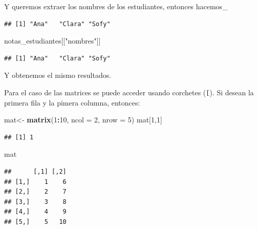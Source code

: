 \documentclass[
]{book}
\newenvironment{Shaded}{\begin{snugshade}}{\end{snugshade}}
\newcommand{\AttributeTok}[1]{\textcolor[rgb]{0.13,0.29,0.53}{#1}}
\newcommand{\DecValTok}[1]{\textcolor[rgb]{0.00,0.00,0.81}{#1}}
\newcommand{\FunctionTok}[1]{\textcolor[rgb]{0.13,0.29,0.53}{\textbf{#1}}}
\newcommand{\NormalTok}[1]{#1}
\newcommand{\OtherTok}[1]{\textcolor[rgb]{0.56,0.35,0.01}{#1}}
\newcommand{\SpecialCharTok}[1]{\textcolor[rgb]{0.81,0.36,0.00}{\textbf{#1}}}
\newcommand{\StringTok}[1]{\textcolor[rgb]{0.31,0.60,0.02}{#1}}
\begin{document}
Y queremos extraer los nombres de los estudiantes, entonces hacemos\_

\begin{Shaded}
\end{Shaded}

\begin{verbatim}
## [1] "Ana"   "Clara" "Sofy"
\end{verbatim}

\begin{Shaded}
\begin{Highlighting}[]
\NormalTok{notas\_estudiantes[[}\StringTok{"nombres"}\NormalTok{]]}
\end{Highlighting}
\end{Shaded}

\begin{verbatim}
## [1] "Ana"   "Clara" "Sofy"
\end{verbatim}

Y obtenemos el mismo resultados.

Para el caso de las matrices se puede acceder usando corchetes (\texttt{{[}}).
Si desean la primera fila y la pimera columna, entonces:

\begin{Shaded}
\begin{Highlighting}[]
\NormalTok{mat}\OtherTok{\textless{}{-}} \FunctionTok{matrix}\NormalTok{(}\DecValTok{1}\SpecialCharTok{:}\DecValTok{10}\NormalTok{, }\AttributeTok{ncol =} \DecValTok{2}\NormalTok{, }\AttributeTok{nrow =} \DecValTok{5}\NormalTok{)}
\NormalTok{mat[}\DecValTok{1}\NormalTok{,}\DecValTok{1}\NormalTok{]}
\end{Highlighting}
\end{Shaded}

\begin{verbatim}
## [1] 1
\end{verbatim}

\begin{Shaded}
\begin{Highlighting}[]
\NormalTok{mat}
\end{Highlighting}
\end{Shaded}

\begin{verbatim}
##      [,1] [,2]
## [1,]    1    6
## [2,]    2    7
## [3,]    3    8
## [4,]    4    9
## [5,]    5   10
\end{verbatim}
\end{document}
